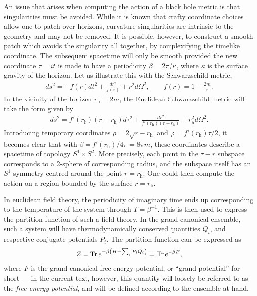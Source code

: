 \documentclass[
twoside,
openright,
frontopenright,
]{dmathesis}
\begin{document}
An issue that arises when computing the action of a black hole metric is that
singularities must be avoided. While it is known that crafty coordinate choices
allow one to patch over horizons, curvature singularities are intrinsic to the
geometry and may not be removed. It is possible, however, to construct a smooth
patch which avoids the singularity all together, by complexifying the timelike
coordinate. The subsequent spacetime will only be smooth provided the new
coordinate $\tau=it$ is made to have a periodicity $\beta = 2\pi/\kappa$, where
$\kappa$ is the surface gravity of the horizon. Let us illustrate this with the
Schwarzschild metric,
\begin{align}
  \label{eq:schwarzschildAF}
  ds^2 = -f(r)dt^2 + \frac{dr^2}{f(r)} + r^2 d\Omega^2, \qquad f(r) = 1-\frac{2m}{r}.
\end{align}
In the vicinity of the horizon $r_\mathrm{h} = 2m$, the Euclidean Schwarzschild
metric will take the form given by
\begin{align}
  \label{eq:schwarzschildAFE}
  ds^2 = f'(r_\mathrm{h})(r-r_\mathrm{h})d\tau^2+
  \frac{dr^2}{f'(r_\mathrm{h})(r-r_\mathrm{h})}+r_\mathrm{h}^2 d\Omega^2.  
\end{align}
Introducing temporary coordinates $\rho = 2\sqrt{r-r_\mathrm{h}}$ and
$\varphi = f'(r_\mathrm{h})\tau/2$, it becomes clear that with
$\beta = f'(r_\mathrm{h})/4\pi = 8\pi m$, these coordinates describe a spacetime
of topology $S^1 \times S^2$. More precisely, each point in the $\tau-r$
subspace corresponds to a 2-sphere of corresponding radius, and the subspace
itself has an $S^1$ symmetry centred around the point $r = r_\mathrm{h}$. One
could then compute the action on a region bounded by the surface
$r = r_\mathrm{b}$.

In euclidean field theory, the periodicity of imaginary time ends up
corresponding to the temperature of the system through $T=\beta^{-1}$. This is
then used to express the partition function of such a field theory. In the grand
canonical ensemble, such a system will have thermodynamically conserved
quantities $Q_i$, and respective conjugate potentials $P_i$. The partition
function can be expressed as
\begin{align}
  \label{eq:partitionfunction2}
  Z = \operatorname{Tr} e^{-\beta\left(H - \sum_iP_i Q_i\right)} = \operatorname{Tr} e^{-\beta F},
\end{align}
where $F$ is the grand canonical free energy potential, or ``grand potential''
for short --- in the current text, however, this quantity will loosely be
referred to as the \emph{free energy potential}, and will be defined according
to the ensemble at hand.
\end{document}
